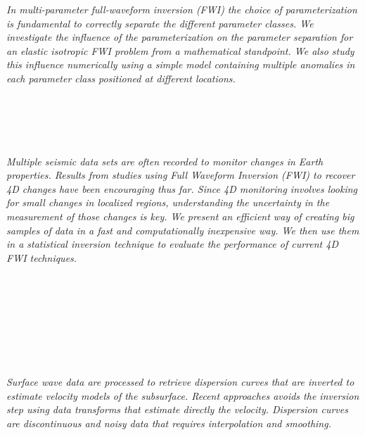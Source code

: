   \begin{multicols}{2}
      \textit{In multi-parameter full-waveform inversion (FWI) the choice of parameterization is fundamental to correctly separate the different parameter classes. We investigate the influence of the parameterization on the parameter separation for an elastic isotropic FWI problem from a mathematical standpoint. We also study this influence numerically using a simple model containing multiple anomalies in each parameter class positioned at different locations.}\\
\\ 
        \\
        \\\\
\\
      \textit{Multiple seismic data sets are often recorded to monitor changes in Earth properties. Results from studies using Full Waveform Inversion (FWI) to recover 4D changes have been encouraging thus far. Since 4D monitoring involves looking for small changes in localized regions, understanding the uncertainty in the measurement of those changes is key. We present an efficient way of creating big samples of data in a fast and computationally inexpensive way. We then use them in a statistical inversion technique to evaluate the performance of current 4D FWI techniques.}\\
\\ 
        \\
        \\\\
        \\
        \\\\
\\
      \textit{Surface wave data are processed to retrieve dispersion curves that are inverted to estimate velocity models of the subsurface. Recent approaches avoids the inversion step using data transforms that estimate directly the velocity. Dispersion curves are discontinuous and noisy data that requires interpolation and smoothing.}\\
\\ 
        \\
        \\\\
\\

\end{multicols}
